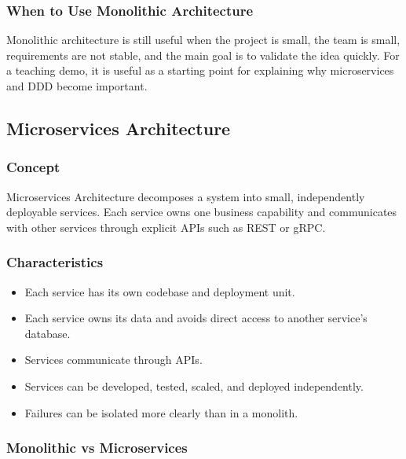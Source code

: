 \documentclass[12pt,a4paper]{article}
\begin{document}
\subsubsection{When to Use Monolithic Architecture}

Monolithic architecture is still useful when the project is small, the team is small, requirements are not stable, and the main goal is to validate the idea quickly. For a teaching demo, it is useful as a starting point for explaining why microservices and DDD become important.

\subsection{Microservices Architecture}

\subsubsection{Concept}

Microservices Architecture decomposes a system into small, independently deployable services. Each service owns one business capability and communicates with other services through explicit APIs such as REST or gRPC.

\subsubsection{Characteristics}

\begin{itemize}
    \item Each service has its own codebase and deployment unit.
    \item Each service owns its data and avoids direct access to another service's database.
    \item Services communicate through APIs.
    \item Services can be developed, tested, scaled, and deployed independently.
    \item Failures can be isolated more clearly than in a monolith.
\end{itemize}

\subsubsection{Monolithic vs Microservices}
\end{document}
